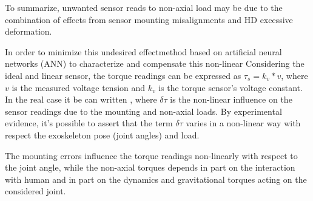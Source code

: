 \par To summarize, unwanted sensor reads to non-axial load may be due to the combination of effects from sensor mounting misalignments and HD excessive deformation. 
\par In order to minimize this undesired effect\DIFdelbegin {}\DIFdelend \DIFaddbegin {}\DIFaddend method based on artificial neural networks (ANN) to characterize and compensate this non-linear \DIFdelbegin {}\DIFdelend \DIFaddbegin {}\DIFaddend %
%
Considering the ideal and linear \DIFaddbegin {}\DIFaddend sensor, the torque readings can be expressed as $\tau_s = k_v * v$, where $v$ is the measured voltage tension and $k_v$ is the torque sensor's voltage constant. In the real case it be can written \DIFdelbegin {}\DIFdelend \DIFaddbegin {}\DIFaddend , where $\delta\tau$ is the non-linear influence on the sensor readings due to the mounting and non-axial loads.
By experimental evidence, it's possible to assert that the term $\delta\tau$ varies in a non-linear way with respect the exoskeleton pose (joint angles) and load.
\par The mounting errors influence the torque readings non-linearly with respect to the joint angle, while the non-axial torques depends in part on the interaction with human and in part on the dynamics and gravitational torques acting on the considered joint.
%
\DIFdelbegin %
